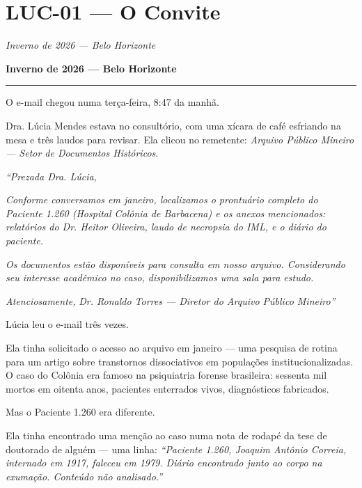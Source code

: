 \section*{\textbf{LUC-01} --- O Convite}

\noindent \textit{Inverno de 2026 --- Belo Horizonte}

\noindent \textbf{Inverno de 2026 --- Belo Horizonte}

\vspace{0.5em}\noindent\rule{\textwidth}{0.5pt}\vspace{0.5em}

\noindent O e-mail chegou numa terça-feira, 8:47 da manhã.

\noindent Dra. Lúcia Mendes estava no consultório, com uma xícara de café esfriando na mesa e três laudos para revisar. Ela clicou no remetente: \textit{Arquivo Público Mineiro --- Setor de Documentos Históricos}.

\noindent \textit{\textquotedblleft{}Prezada Dra. Lúcia,}

\noindent \textit{Conforme conversamos em janeiro, localizamos o prontuário completo do Paciente 1.260 (Hospital Colônia de Barbacena) e os anexos mencionados: relatórios do Dr. Heitor Oliveira, laudo de necropsia do IML, e o diário do paciente.}

\noindent \textit{Os documentos estão disponíveis para consulta em nosso arquivo. Considerando seu interesse acadêmico no caso, disponibilizamos uma sala para estudo.}

\noindent \textit{Atenciosamente,}
\textit{Dr. Ronaldo Torres --- Diretor do Arquivo Público Mineiro\textquotedblright{}}

\noindent Lúcia leu o e-mail três vezes.

\noindent Ela tinha solicitado o acesso ao arquivo em janeiro --- uma pesquisa de rotina para um artigo sobre transtornos dissociativos em populações institucionalizadas. O caso do Colônia era famoso na psiquiatria forense brasileira: sessenta mil mortos em oitenta anos, pacientes enterrados vivos, diagnósticos fabricados.

\noindent Mas o Paciente 1.260 era diferente.

\noindent Ela tinha encontrado uma menção ao caso numa nota de rodapé da tese de doutorado de alguém --- uma linha: \textit{\textquotedblleft{}Paciente 1.260, Joaquim Antônio Correia, internado em 1917, faleceu em 1979. Diário encontrado junto ao corpo na exumação. Conteúdo não analisado.\textquotedblright{}}

